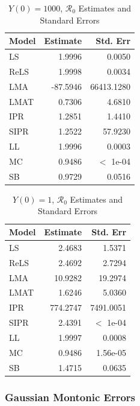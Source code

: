 \documentclass[12pt]{article}
\newcommand{\rr}{\ensuremath{\mathcal{R}_0}}
\begin{document}
\begin{table}[H]
	
	\centering
	\begin{tabular}[t]{l|r|r}
		\hline
		Model & Estimate & Std. Err\\
		\hline
		LS & 1.9996 & 0.0050\\
		\hline
		ReLS & 1.9998 & 0.0034\\
		\hline
		LMA & -87.5946 & 66413.1280\\
		\hline
		LMAT & 0.7306 & 4.6810\\
		\hline
		IPR & 1.2851 & 1.4410\\
		\hline
		SIPR & 1.2522 & 57.9230\\
		\hline
		LL & 1.9996 & 0.0003 \\
		\hline
		MC & 0.9486 & $<$ 1e-04\\
		\hline
		SB & 0.9729 & 0.0516\\
		\hline
	\end{tabular}
        \caption{$Y(0) = 1000$, $\rr$ Estimates and Standard Errors}\label{tab:inits-res1}
\end{table}

\begin{table}[H]
	
	\centering
	\begin{tabular}[t]{l|r|r}
		\hline
		Model & Estimate & Std. Err\\
		\hline
		LS & 2.4683 & 1.5371\\
		\hline
		ReLS & 2.4692 & 2.7294 \\
		\hline
		LMA & 10.9282 & 19.2974 \\
		\hline
		LMAT & 1.6246 & 5.0360\\
		\hline
		IPR & 774.2747 & 7491.0051 \\
		\hline
		SIPR & 2.4391 & $<$ 1e-04 \\
		\hline
		LL & 1.9997 & 0.0008\\
		\hline
		MC & 0.9486 & 1.56e-05\\
		\hline
		SB & 1.4715 & 0.0635\\
		\hline
	\end{tabular}
        \caption{$Y(0) = 1$, $\rr$ Estimates and Standard Errors}\label{tab:inits-res2}
\end{table}

\subsubsection{Gaussian Montonic Errors}
\end{document}
